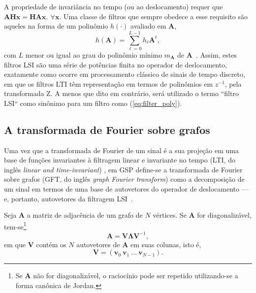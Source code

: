 A propriedade de invari\^ancia no tempo (ou ao deslocamento) requer que $ \mathbf{A} \mathbf{H} \mathbf{x} = \mathbf{H} \mathbf{A} \mathbf{x} {,} \ \forall \mathbf{x}$. Uma classe de filtros que sempre obedece a esse requisito s\~ao aqueles na forma de um polin\^omio $ h(\cdot) $ avaliado em $ \mathbf{A} $,
\begin{equation}
\label{eq:filter_poly}
h(\mathbf{A}) = \sum_{\ell=0}^{L-1} h_\ell \mathbf{A}^\ell,
\end{equation}
com $ L$ menor ou igual ao grau do polin\^omio m\'inimo $ m_\mathbf{A} $ de $ \mathbf{A}$~\cite{sandryhaila2013discrete,sandryhaila2014big}. Assim, estes filtros LSI s\~ao uma s\'erie de pot\^encias finita no operador de deslocamento, exatamente como ocorre em processamento cl\'assico de sinais de tempo discreto, em que os filtros LTI t\^em representa\c c\~ao em termos de polin\^omios em $ z^{-1} $, pela transformada Z. A menos que dito em contr\'ario, ser\'a utilizado o termo ``filtro LSI`` como sin\^onimo para um filtro como (\ref{eq:filter_poly}).

\subsection{A transformada de Fourier sobre grafos}

Uma vez que a transformada de Fourier de um sinal \'e a sua proje\c{c}\~ao em uma base de fun\c{c}\~oes invariantes \`a  filtragem linear e invariante no tempo (LTI, do ingl\^es \emph{linear and time-invariant}) \cite{oppenheim1997signals}, em GSP define-se a transformada de Fourier sobre grafos (GFT, do ingl\^es \emph{graph Fourier transform}) como a decomposi\c{c}\~ao de um sinal em termos de uma base de autovetores do operador de deslocamento --- e, portanto, autovetores da filtragem LSI~\cite{sandryhaila2013gft}.

Seja $ \mathbf{A} $ a matriz de adjac\^encia de um grafo de $ N $ v\'ertices. Se $ \mathbf{A} $ for diagonaliz\'avel, tem-se\footnote{Se $\mathbf{A}$ n\~ao for diagonaliz\'avel, o racioc\'inio pode ser repetido utilizando-se a forma can\^onica de Jordan.}
\begin{equation}\label{eq:gft_01}
\mathbf{A} = \mathbf{V} \mathbf{\Lambda} \mathbf{V}^{-1},
\end{equation}
em que $ \mathbf{V} $ cont\'em os $ N $ autovetores de $ \mathbf{A} $ em suas colunas, isto \'e,
\begin{equation}\label{eq:gft_02}
\mathbf{V} = (\mathbf{v}_0 \ \mathbf{v}_1 \ \dots\ \mathbf{v}_{N-1}).
\end{equation}

